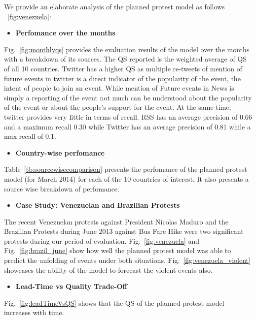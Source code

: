 We provide an elaborate analysis of the planned protest model as follows ~\ref{fig:venezuela}:
\begin{itemize}
    \item {\bf Perfomance over the months}
\end{itemize}
    Fig.~\ref{fig:monthlyqs} provides the evaluation results of the model over the months with a breakdown of its sources. The QS reported is the weighted average of QS of all 10 countries.
    Twitter has a higher QS as multiple re-tweets of mention of future events in twitter is a direct indicator of the popularity of the event, the intent of people to join an event. While mention of Future events in News is simply a reporting of the event not much can be understood about the popularity of the event or about the people's support for the event. At the same time, twitter provides very little in terms of recall.
RSS has an average precision of 0.66 and a maximum recall 0.30 while
Twitter has an average precision of 0.81 while a max recall of 0.1.

\begin{itemize}
    \item {\bf Country-wise perfomance}
\end{itemize}
    Table~\ref{tb:sourcewisecomparison} presents the perfomance of the planned protest model (for March 2014) for each of the 10 countries of interest. It also presents a source wise breakdown of perfomance. 


\begin{itemize}
    \item {\bf Case Study: Venezuelan and Brazilian Protests}
\end{itemize}
The recent Venezuelan protests against President Nicolas Maduro and the Brazilian Protests during June 2013 against Bus Fare Hike were two significant protests during our period of evaluation. Fig.~\ref{fig:venezuela} and Fig.~\ref{fig:brazil_june} show how well the planned protest model was able to predict the unfolding of events under both situations. Fig.~\ref{fig:venezuela_violent} showcases the ability of the model to forecast the violent events also.

\begin{itemize}
    \item {\bf Lead-Time vs Quality Trade-Off}
\end{itemize}

Fig.~\ref{fig:leadTimeVsQS} shows that the QS of the planned protest model increases with time.

